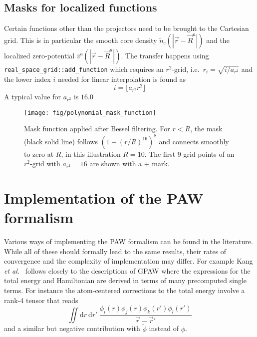 \documentclass[oribibl]{llncs}
\newcommand{\m}[1]{{\mathrm{#1}}}
\newcommand{\um}[1]{_{\mathrm{#1}}}
\newcommand{\ttt}[1]{\texttt{#1}}
\begin{document}
\subsection{Masks for localized functions}
%
Certain functions other than the projectors 
need to be brought to the Cartesian grid.
This is in particular 
the smooth core density $\tilde n\um{c}(|\vec r - \vec R^a|)$ and 
the localized zero-potential  $\bar v^a(|\vec r - \vec R^a|)$.
The transfer happens using \ttt{real\_space\_grid::add\_function}
which requires an $r^2$-grid, i.e.~$r_i = \sqrt{i/a_{r^2}}$ and
the lower index $i$ needed for linear interpolation is found as
$$ i = \lfloor a_{r^2} r^2 \rfloor $$
A typical value for $a_{r^2}$ is $16.0$

\begin{figure} [ht]
  \centering
  \begin{minipage}[c]{.990\textwidth}
	\texttt{[image: fig/polynomial\_mask\_function]} %
  \end{minipage}\hfill
  \begin{minipage}[c]{.009\textwidth}
  \end{minipage}
  \caption{Mask function applied after Bessel filtering.
  For $r < R$, the mask (black solid line) follows $(1 - (r/R)^{16})^8$ 
  and connects smoothly to zero at $R$, in this illustration $R = 10$.
  The first 9 grid points of an $r^2$-grid with $a_{r^2}=16$ are shown with a + mark.
  } \label{fig:mask_function}
\end{figure}


\clearpage

\section{Implementation of the PAW formalism} \label{sec:paw-theory}
%
Various ways of implementing the \ac{PAW} formalism can be found in the literature.
While all of these should formally lead to the same results,
their rates of convergence and the complexity of implementation may differ.
For example Kang \emph{et al.}~ \cite{Kang2016}
follows closely to the descriptions of GPAW \cite{Rostgaard-paw-note}
where the expressions for the total energy and Hamiltonian are derived
in terms of many precomputed single terms.
For instance the atom-centered corrections to the total energy
involve a rank-4 tensor that reads
\begin{equation}
	\iint \m dr \ \m dr' \   \frac{ \phi_i(r) \phi_j(r) \phi_k(r') \phi_l(r') }{\vec r - \vec r'}
\end{equation}
and a similar but negative contribution with $\tilde \phi$ instead of $\phi$.
\end{document}
